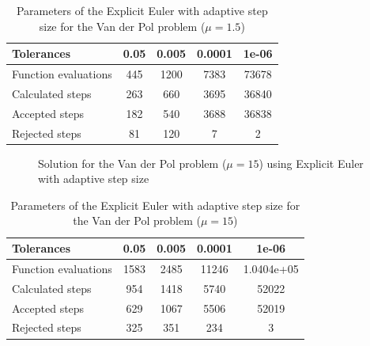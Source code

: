 \begin{table}[H]
    \centering
    \begin{tabular}{@{}l|cccc@{}}
    \toprule
    Tolerances           & 0.05 & 0.005 & 0.0001 & 1e-06 \\ \midrule
    Function evaluations & 445  & 1200  & 7383   & 73678 \\
    Calculated steps     & 263  & 660   & 3695   & 36840 \\
    Accepted steps       & 182  & 540   & 3688   & 36838 \\
    Rejected steps       & 81   & 120   & 7      & 2     \\ \bottomrule
    \end{tabular}
    \caption{Parameters of the Explicit Euler with adaptive step size for the Van der Pol problem ($\mathit{\mu = 1.5}$)}
    \label{2_4_adaptive_mu_1_5_table}
\end{table}

\begin{figure}[H]
    \centering
    \caption{Solution for the Van der Pol problem ($\mathit{\mu = 15}$) using Explicit Euler with adaptive step size}
    \label{2_4_adaptive_mu_15}
\end{figure}

\begin{table}[H]
    \centering
    \begin{tabular}{@{}l|cccc@{}}    \toprule
    Tolerances           & 0.05 & 0.005 & 0.0001 & 1e-06      \\ \midrule
    Function evaluations & 1583 & 2485  & 11246  & 1.0404e+05 \\
    Calculated steps     & 954  & 1418  & 5740   & 52022      \\
    Accepted steps       & 629  & 1067  & 5506   & 52019      \\
    Rejected steps       & 325  & 351   & 234    & 3          \\ \bottomrule
    \end{tabular}
    \caption{Parameters of the Explicit Euler with adaptive step size for the Van der Pol problem ($\mathit{\mu = 15}$)}
    \label{2_4_adaptive_mu_15_table}
\end{table}

